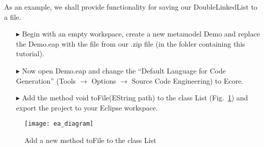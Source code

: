 As an example, we shall provide functionality for saving our \textsf{DoubleLinkedList} to a file.

\begin{enumerate}
  \item[$\blacktriangleright$] Begin with an empty workspace, create a new metamodel \textsf{Demo} and replace the \textsf{Demo.eap} with the file from our .zip
  file (in the folder containing this tutorial).
  \item[$\blacktriangleright$] Now open \textsf{Demo.eap} and change the ``Default Language for Code Generation'' (Tools $\rightarrow$ Options $\rightarrow$
  Source Code Engineering) to \textsf{Ecore}.
  \item[$\blacktriangleright$] Add the method \textsf{void toFile(EString path)} to the class \textsf{List} (Fig.~\ref{fig:append_inj_diagram}) and export the
  project to your Eclipse workspace.
\end{enumerate}
\begin{figure}[htbp]
\begin{center}
  \texttt{[image: ea\_diagram]}
  \caption{Add a new method \textsf{toFile} to the class \textsf{List}}
  \label{fig:append_inj_diagram}
\end{center}
\end{figure}

